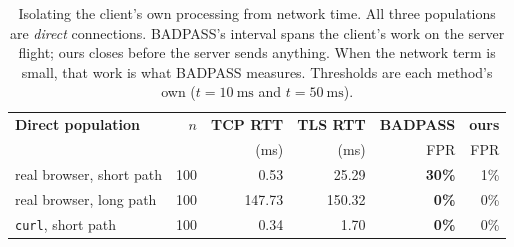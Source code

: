 \begin{table}[t]
\centering\footnotesize
\caption{Isolating the client's own processing from network time.
All three populations are \emph{direct} connections. BADPASS's interval
spans the client's work on the server flight; ours closes before the
server sends anything. When the network term is small, that work is what
BADPASS measures. Thresholds are each method's own
($t=\SI{10}{\milli\second}$ and $t=\SI{50}{\milli\second}$).}
\label{tab:clientwork}
\begin{tabular}{@{}lrrrrr@{}}
\toprule
\textbf{Direct population} & \textbf{$n$} & \textbf{TCP RTT} & \textbf{TLS RTT} & \textbf{BADPASS} & \textbf{ours}\\
 & & (ms) & (ms) & FPR & FPR\\
\midrule
real browser, short path & 100 & 0.53 & 25.29 & \textbf{30\%} & 1\%\\
real browser, long path & 100 & 147.73 & 150.32 & \textbf{0\%} & 0\%\\
\texttt{curl}, short path & 100 & 0.34 & 1.70 & \textbf{0\%} & 0\%\\
\bottomrule
\end{tabular}
\end{table}
